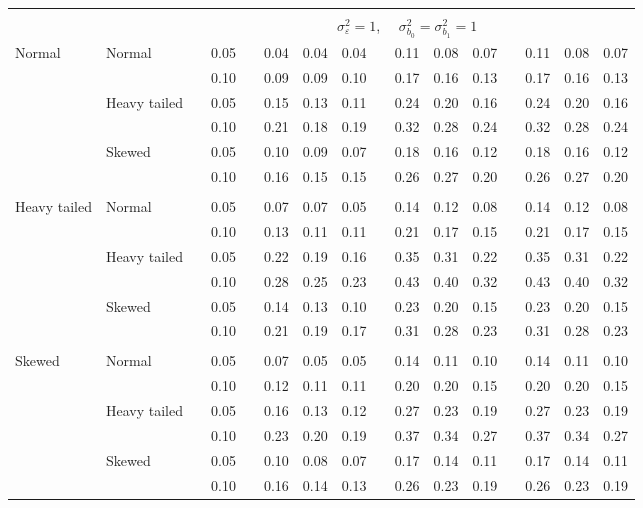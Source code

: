 \documentclass{article} %
\begin{document}
\begin{table}[ht]
\begin{scriptsize}
\begin{center}
\begin{tabular}{ll p{.1cm} c p{.1cm} rrr p{.1cm} rrr p{.1cm} rrr}
&&&&&&&&&&&&&&&\\
& && && \multicolumn{9}{c}{$\sigma_{\varepsilon}^2 = 1$, \ \ $\sigma_{b_0}^2 = \sigma_{b_1}^2 = 1$} \\ \cline{6-16}
Normal       & Normal       && 0.05 &&  0.04 & 0.04 & 0.04 && 0.11 & 0.08 & 0.07 && 0.11 & 0.08 & 0.07 \\ 
             &              && 0.10 &&  0.09 & 0.09 & 0.10 && 0.17 & 0.16 & 0.13 && 0.17 & 0.16 & 0.13 \\ 
             & Heavy tailed && 0.05 &&  0.15 & 0.13 & 0.11 && 0.24 & 0.20 & 0.16 && 0.24 & 0.20 & 0.16 \\ 
             &              && 0.10 &&  0.21 & 0.18 & 0.19 && 0.32 & 0.28 & 0.24 && 0.32 & 0.28 & 0.24 \\ 
             & Skewed       && 0.05 &&  0.10 & 0.09 & 0.07 && 0.18 & 0.16 & 0.12 && 0.18 & 0.16 & 0.12 \\ 
             &              && 0.10 &&  0.16 & 0.15 & 0.15 && 0.26 & 0.27 & 0.20 && 0.26 & 0.27 & 0.20 \\ 
             &&&&&&&&&&&&&&&\\
Heavy tailed & Normal       && 0.05 &&  0.07 & 0.07 & 0.05 && 0.14 & 0.12 & 0.08 && 0.14 & 0.12 & 0.08 \\ 
             &              && 0.10 &&  0.13 & 0.11 & 0.11 && 0.21 & 0.17 & 0.15 && 0.21 & 0.17 & 0.15 \\ 
             & Heavy tailed && 0.05 &&  0.22 & 0.19 & 0.16 && 0.35 & 0.31 & 0.22 && 0.35 & 0.31 & 0.22 \\ 
             &              && 0.10 &&  0.28 & 0.25 & 0.23 && 0.43 & 0.40 & 0.32 && 0.43 & 0.40 & 0.32 \\ 
             & Skewed       && 0.05 &&  0.14 & 0.13 & 0.10 && 0.23 & 0.20 & 0.15 && 0.23 & 0.20 & 0.15 \\ 
             &              && 0.10 &&  0.21 & 0.19 & 0.17 && 0.31 & 0.28 & 0.23 && 0.31 & 0.28 & 0.23 \\ 
             &&&&&&&&&&&&&&&\\
Skewed       & Normal       && 0.05 &&  0.07 & 0.05 & 0.05 && 0.14 & 0.11 & 0.10 && 0.14 & 0.11 & 0.10 \\ 
             &              && 0.10 &&  0.12 & 0.11 & 0.11 && 0.20 & 0.20 & 0.15 && 0.20 & 0.20 & 0.15 \\ 
             & Heavy tailed && 0.05 &&  0.16 & 0.13 & 0.12 && 0.27 & 0.23 & 0.19 && 0.27 & 0.23 & 0.19 \\ 
             &              && 0.10 &&  0.23 & 0.20 & 0.19 && 0.37 & 0.34 & 0.27 && 0.37 & 0.34 & 0.27 \\ 
             & Skewed       && 0.05 &&  0.10 & 0.08 & 0.07 && 0.17 & 0.14 & 0.11 && 0.17 & 0.14 & 0.11 \\ 
             &              && 0.10 &&  0.16 & 0.14 & 0.13 && 0.26 & 0.23 & 0.19 && 0.26 & 0.23 & 0.19 \\ 



\end{tabular}
\end{center}
\end{scriptsize}
\end{table}
\end{document}
